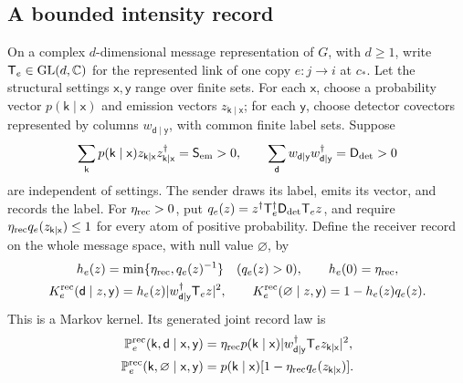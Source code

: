 \subsection{A bounded intensity record}
\label{sec:obs-intensity-record}

On a complex $d$-dimensional message representation of $G$, with $d\geq1$, write
$\mathsf T_e\in\mathrm{GL}(d,\mathbb C)$ for the represented link of one copy
$e:j\to i$ at $c_*$. Let the structural settings $\mathsf x,\mathsf y$ range
over finite sets. For each $\mathsf x$, choose a probability vector
$p(\mathsf k\mid\mathsf x)$ and emission vectors $z_{\mathsf k\mid\mathsf x}$;
for each $\mathsf y$, choose detector covectors represented by columns
$w_{\mathsf d\mid\mathsf y}$, with common finite label sets. Suppose
\begin{equation}
\sum_{\mathsf k}p(\mathsf k\mid\mathsf x)
 z_{\mathsf k\mid\mathsf x}z_{\mathsf k\mid\mathsf x}^{\dagger}
 =\mathsf S_{\rm em}>0,
\qquad
\sum_{\mathsf d}w_{\mathsf d\mid\mathsf y}w_{\mathsf d\mid\mathsf y}^{\dagger}
 =\mathsf D_{\rm det}>0
\label{eq:obs-intensity-moments}
\end{equation}
are independent of settings. The sender draws its label, emits its vector,
and records the label. For $\eta_{\rm rec}>0$, put
$q_e(z)=z^{\dagger}\mathsf T_e^{\dagger}\mathsf D_{\rm det}\mathsf T_e z$,
and require $\eta_{\rm rec}q_e(z_{\mathsf k\mid\mathsf x})\leq1$
for every atom of positive probability. Define the receiver record on the
whole message space, with null value $\varnothing$, by
\begin{equation}
\begin{gathered}
h_e(z)=\min\{\eta_{\rm rec},q_e(z)^{-1}\}\quad(q_e(z)>0),
\qquad h_e(0)=\eta_{\rm rec},\\
K_e^{\rm rec}(\mathsf d\mid z,\mathsf y)
 =h_e(z)|w_{\mathsf d\mid\mathsf y}^{\dagger}\mathsf T_ez|^2,
\qquad
K_e^{\rm rec}(\varnothing\mid z,\mathsf y)=1-h_e(z)q_e(z).
\end{gathered}
\label{eq:obs-intensity-kernel}
\end{equation}
This is a Markov kernel. Its generated joint record law is
\begin{align}
\mathbb P_e^{\rm rec}(\mathsf k,\mathsf d\mid\mathsf x,\mathsf y)
 &=\eta_{\rm rec}p(\mathsf k\mid\mathsf x)
 |w_{\mathsf d\mid\mathsf y}^{\dagger}\mathsf T_ez_{\mathsf k\mid\mathsf x}|^2,
\label{eq:obs-intensity-joint}\\
\mathbb P_e^{\rm rec}(\mathsf k,\varnothing\mid\mathsf x,\mathsf y)
 &=p(\mathsf k\mid\mathsf x)
 [1-\eta_{\rm rec}q_e(z_{\mathsf k\mid\mathsf x})].\nonumber
\end{align}
